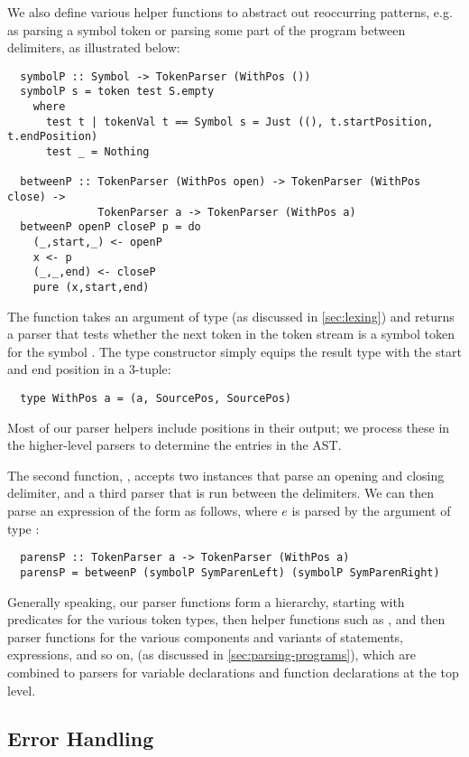 We also define various helper functions to abstract out reoccurring patterns,
e.g. as parsing a symbol token or parsing some part of the program between
delimiters, as illustrated below:
\begin{verbatim}
  symbolP :: Symbol -> TokenParser (WithPos ())
  symbolP s = token test S.empty
    where
      test t | tokenVal t == Symbol s = Just ((), t.startPosition, t.endPosition)
      test _ = Nothing

  betweenP :: TokenParser (WithPos open) -> TokenParser (WithPos close) ->
              TokenParser a -> TokenParser (WithPos a)
  betweenP openP closeP p = do
    (_,start,_) <- openP
    x <- p
    (_,_,end) <- closeP
    pure (x,start,end)
\end{verbatim}
%
The function  takes an argument  of type
 (as discussed in \cref{sec:lexing}) and returns a parser that
tests whether the next token in the token stream is a symbol token for the
symbol .
The  type constructor simply equips the result type with the
start and end position in a 3-tuple:
\begin{verbatim}
  type WithPos a = (a, SourcePos, SourcePos)
\end{verbatim}
Most of our parser helpers include positions in their output; we process these
in the higher-level parsers to determine the  entries in the AST.

The second function, , accepts two 
instances that parse an opening and closing delimiter, and a third parser
 that is run between the delimiters.
We can then parse an expression of the form  as follows, where $e$
is parsed by the argument of type :
\begin{verbatim}
  parensP :: TokenParser a -> TokenParser (WithPos a)
  parensP = betweenP (symbolP SymParenLeft) (symbolP SymParenRight)
\end{verbatim}

Generally speaking, our parser functions form a hierarchy, starting with
predicates for the various token types, then helper functions such as
, and then parser functions for the various components and
variants of statements, expressions, and so on, (as discussed in
\cref{sec:parsing-programs}), which are combined to parsers for variable
declarations and function declarations at the top level.


\subsection{Error Handling} \label{sec:parser-error-handling}

